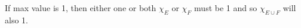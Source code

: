 \documentclass[preview]{standalone}
\begin{document}
\begin{center}
If max value is 1, then either one or both $\chi_{E}$ or $\chi_{F}$ must be 1 and so $\chi_{E \cup F}$ will also 1.
\end{center}
\end{document}
